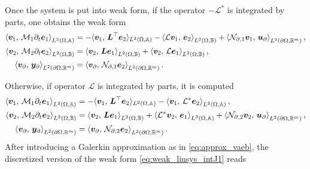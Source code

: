 Once the system is put into weak form, if the operator $\mathcal{-L^*}$ is integrated by parts, one obtains the weak form 
\begin{equation}\label{eq:weak_linsys_intJ1}
\begin{aligned}
\inner[L^2(\Omega, \mathbb{A})]{\bm{v}_1}{\mathcal{M}_1 \partial_t \bm{e}_1} &=   -  \langle{\bm{v}_1}, \,{\bm{L}^\top \bm{e}_2}\rangle_{L^2(\Omega, \mathbb{A})}  -\inner[L^2(\Omega, \mathbb{B})]{\mathcal{L}\bm{v}_1}{\bm{e}_2} + \inner[L^2(\partial \Omega, \mathbb{R}^m)]{\mathcal{N}_{\partial, 1} \bm{v}_1}{\bm{u}_\partial}, \\
\inner[L^2(\Omega, \mathbb{B})]{\bm{v}_2}{\mathcal{M}_2 \partial_t \bm{e}_2} &=   \inner[L^2(\Omega, \mathbb{B})]{\bm{v}_2}{\bm{L}\bm{e}_1} + \inner[L^2(\Omega, \mathbb{B})]{\bm{v}_2}{\mathcal{L}\bm{e}_1}, \\
\inner[L^2(\partial \Omega, \mathbb{R}^m)]{\bm{v}_\partial}{\bm{y}_\partial} &= \inner[L^2(\partial \Omega, \mathbb{R}^m)]{\bm{v}_\partial}{\mathcal{N}_{\partial, 1}\bm{e}_2}.
\end{aligned}
\end{equation}

Otherwise, if operator $\mathcal{L}$ is integrated by parts, it is computed  
\begin{equation}\label{eq:weak_linsys_intJ2}
\begin{aligned}
\inner[L^2(\Omega, \mathbb{A})]{\bm{v}_1}{\mathcal{M}_1 \partial_t \bm{e}_1} &=   -  \langle{\bm{v}_1}, \,{\bm{L}^\top \bm{e}_2}\rangle_{L^2(\Omega, \mathbb{A})}  -\inner[L^2(\Omega, \mathbb{A})]{\bm{v}_1}{\mathcal{L}^*\bm{e}_2}, \\
\inner[L^2(\Omega, \mathbb{B})]{\bm{v}_2}{\mathcal{M}_2 \partial_t \bm{e}_2} &=   \inner[L^2(\Omega, \mathbb{B})]{\bm{v}_2}{\bm{L}\bm{e}_1}  + \inner[L^2(\Omega, \mathbb{A})]{\mathcal{L}^*\bm{v}_2}{\bm{e}_1} + \inner[L^2(\partial \Omega, \mathbb{R}^m)]{\mathcal{N}_{\partial, 2} \bm{v}_2}{\bm{u}_{\partial}}, \\
\inner[L^2(\partial \Omega, \mathbb{R}^m)]{\bm{v}_\partial}{\bm{y}_\partial} &= \inner[L^2(\partial \Omega, \mathbb{R}^m)]{\bm{v}_\partial}{\mathcal{N}_{\partial, 2}\bm{e}_2}.
\end{aligned}
\end{equation}
After introducing a Galerkin approximation as in \eqref{eq:approx_vaeb}, the discretized version of the weak form \eqref{eq:weak_linsys_intJ1} reads

